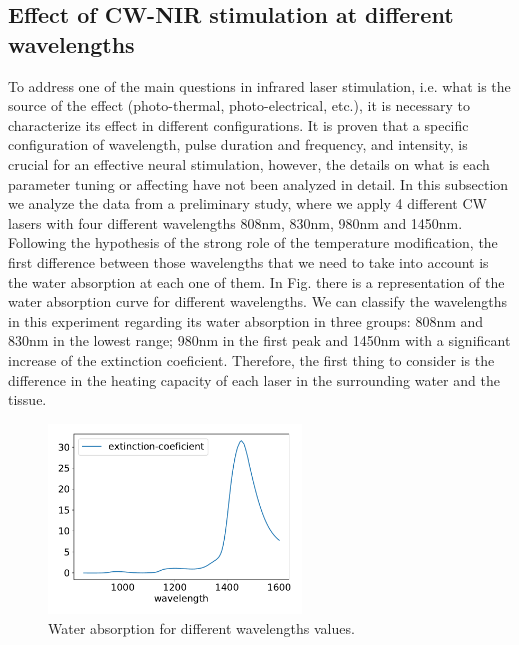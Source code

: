 \subsection{Effect of CW-NIR stimulation at different wavelengths}
To address one of the main questions in infrared laser stimulation, i.e. what is the source of the effect (photo-thermal, photo-electrical, etc.), it is necessary to characterize its effect in different configurations. It is proven that a specific configuration of wavelength, pulse duration and frequency, and intensity, is crucial for an effective neural stimulation, however, the details on what is each parameter tuning or affecting  have not been analyzed in detail. In this subsection we analyze the data from a preliminary study, where we apply 4 different CW lasers with four different wavelengths 808nm, 830nm, 980nm and 1450nm. Following the hypothesis of the strong role of the temperature modification, the first difference between those wavelengths that we need to take into account is the water absorption at each one of them. In Fig. there is a representation of the water absorption curve for different wavelengths. We can classify the wavelengths in this experiment regarding its water absorption in three groups: 808nm and 830nm in the lowest range; 980nm in the first peak and 1450nm with a significant increase of the extinction coeficient. Therefore, the first thing to consider is the difference in the heating capacity of each laser in the surrounding water and the tissue. 

\begin{figure}[hbt]
	\centering
	\includegraphics[width=0.6\textwidth]{img/laser/wavelength/water_absoption_wavelength.pdf}
    \caption{Water absorption for different wavelengths values.}
\end{figure}

